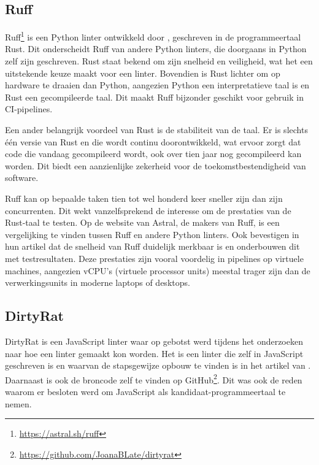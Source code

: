 \subsection{Ruff}
Ruff\footnote{\url{https://astral.sh/ruff}} is een Python linter ontwikkeld door \textcite{Astral2024}, geschreven in de programmeertaal Rust. Dit onderscheidt Ruff van andere Python linters, die doorgaans in Python zelf zijn geschreven. Rust staat bekend om zijn snelheid en veiligheid, wat het een uitstekende keuze maakt voor een linter. Bovendien is Rust lichter om op hardware te draaien dan Python, aangezien Python een interpretatieve taal is en Rust een gecompileerde taal. Dit maakt Ruff bijzonder geschikt voor gebruik in CI-pipelines. 

Een ander belangrijk voordeel van Rust is de stabiliteit van de taal. Er is slechts één versie van Rust en die wordt continu doorontwikkeld, wat ervoor zorgt dat code die vandaag gecompileerd wordt, ook over tien jaar nog gecompileerd kan worden. Dit biedt een aanzienlijke zekerheid voor de toekomstbestendigheid van software.

Ruff kan op bepaalde taken tien tot wel honderd keer sneller zijn dan zijn concurrenten. Dit wekt vanzelfsprekend de interesse om de prestaties van de Rust-taal te testen. Op de website van Astral, de makers van Ruff, is een vergelijking te vinden tussen Ruff en andere Python linters. Ook \textcite{TurnerTrauring2023} bevestigen in hun artikel dat de snelheid van Ruff duidelijk merkbaar is en onderbouwen dit met testresultaten. Deze prestaties zijn vooral voordelig in pipelines op virtuele machines, aangezien vCPU's (virtuele processor units) meestal trager zijn dan de verwerkingsunits in moderne laptops of desktops.

\subsection{DirtyRat}
\label{subsec:dirtyrat}
DirtyRat is een JavaScript linter waar op gebotst werd tijdens het onderzoeken naar hoe een linter gemaakt kon worden. Het is een linter die zelf in JavaScript geschreven is en waarvan de stapsgewijze opbouw te vinden is in het artikel van \textcite{BorgesLate2021}. Daarnaast is ook de broncode zelf te vinden op GitHub\footnote{\url{https://github.com/JoanaBLate/dirtyrat}}. Dit was ook de reden waarom er besloten werd om JavaScript als kandidaat-programmeertaal te nemen. 

